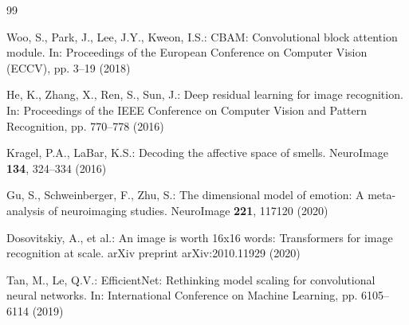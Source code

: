 \documentclass[twocolumn, sn-mathphys, Numbered]{sn-jnl}
\begin{document}
\begin{thebibliography}{99}

Woo, S., Park, J., Lee, J.Y., Kweon, I.S.: CBAM: Convolutional block attention module. In: Proceedings of the European Conference on Computer Vision (ECCV), pp. 3–19 (2018)

He, K., Zhang, X., Ren, S., Sun, J.: Deep residual learning for image recognition. In: Proceedings of the IEEE Conference on Computer Vision and Pattern Recognition, pp. 770–778 (2016)

Kragel, P.A., LaBar, K.S.: Decoding the affective space of smells. NeuroImage \textbf{134}, 324–334 (2016)

Gu, S., Schweinberger, F., Zhu, S.: The dimensional model of emotion: A meta-analysis of neuroimaging studies. NeuroImage \textbf{221}, 117120 (2020)

Dosovitskiy, A., et al.: An image is worth 16x16 words: Transformers for image recognition at scale. arXiv preprint arXiv:2010.11929 (2020)

Tan, M., Le, Q.V.: EfficientNet: Rethinking model scaling for convolutional neural networks. In: International Conference on Machine Learning, pp. 6105–6114 (2019)

\end{thebibliography}
\end{document}

